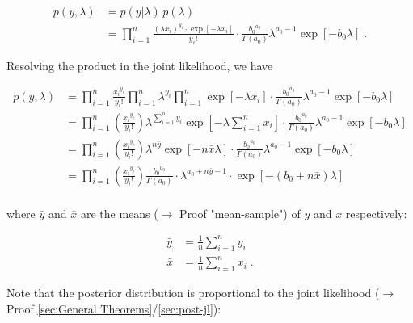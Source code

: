 \documentclass[a4paper,12pt,twoside]{book}
\begin{document}
\begin{equation} \label{eq:poissexp-post-Poiss-exp-JL-s1}
\begin{split}
p(y,\lambda) &= p(y|\lambda) \, p(\lambda) \\
&= \prod_{i=1}^n \frac{(\lambda x_i)^{y_i} \cdot \exp\left[-\lambda x_i\right]}{y_i !} \cdot \frac{ {b_0}^{a_0}}{\Gamma(a_0)} \lambda^{a_0-1} \exp[-b_0 \lambda] \; .
\end{split}
\end{equation}

Resolving the product in the joint likelihood, we have

\begin{equation} \label{eq:poissexp-post-Poiss-JL-s2}
\begin{split}
p(y,\lambda) &= \prod_{i=1}^n \frac{ {x_i}^{y_i}}{y_i !} \prod_{i=1}^n \lambda^{y_i} \prod_{i=1}^n \exp\left[-\lambda x_i\right] \cdot \frac{ {b_0}^{a_0}}{\Gamma(a_0)} \lambda^{a_0-1} \exp[-b_0 \lambda] \\
&= \prod_{i=1}^n \left(\frac{ {x_i}^{y_i}}{y_i !}\right) \lambda^{\sum_{i=1}^n y_i} \exp\left[-\lambda \sum_{i=1}^n x_i\right] \cdot \frac{ {b_0}^{a_0}}{\Gamma(a_0)} \lambda^{a_0-1} \exp[-b_0 \lambda] \\
&= \prod_{i=1}^n \left(\frac{ {x_i}^{y_i}}{y_i !}\right) \lambda^{n \bar{y}} \exp\left[-n \bar{x} \lambda\right] \cdot \frac{ {b_0}^{a_0}}{\Gamma(a_0)} \lambda^{a_0-1} \exp[-b_0 \lambda] \\
&= \prod_{i=1}^n \left(\frac{ {x_i}^{y_i}}{y_i !}\right) \frac{ {b_0}^{a_0}}{\Gamma(a_0)}  \cdot \lambda^{a_0 + n \bar{y} - 1} \cdot \exp\left[-(b_0 + n \bar{x}) \lambda\right] \\
\end{split}
\end{equation}

where $\bar{y}$ and $\bar{x}$ are the means ($\rightarrow$ Proof "mean-sample") of $y$ and $x$ respectively:

\begin{equation} \label{eq:poissexp-post-xy-mean}
\begin{split}
\bar{y} &= \frac{1}{n} \sum_{i=1}^n y_i \\
\bar{x} &= \frac{1}{n} \sum_{i=1}^n x_i \; .
\end{split}
\end{equation}

Note that the posterior distribution is proportional to the joint likelihood ($\rightarrow$ Proof \ref{sec:General Theorems}/\ref{sec:post-jl}):
\end{document}
